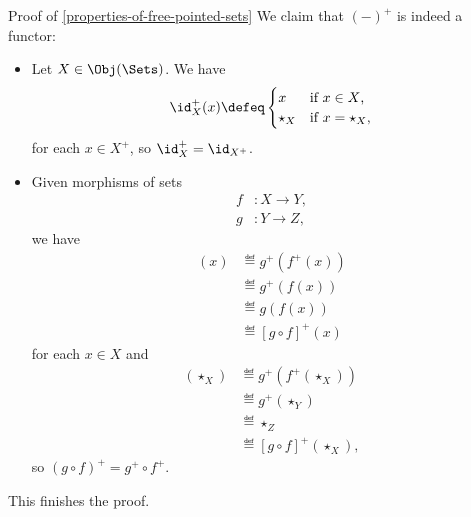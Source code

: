 \begin{Proof}{Proof of \cref{properties-of-free-pointed-sets}}%
    We claim that $(-)^{+}$ is indeed a functor:
    \begin{itemize}
        \item{}Let $X\in\Obj(\Sets)$. We have
            \[
                \id^{+}_{X}(x)%
                \defeq%
                \begin{cases}
                    x         &\text{if $x\in X$,}\\
                    \star_{X} &\text{if $x=\star_{X}$,}
                \end{cases}
            \]%
            for each $x\in X^{+}$, so $\id^{+}_{X}=\id_{X^{+}}$.
        \item{}Given morphisms of sets
            \begin{align*}
                f &\colon X \to Y,\\
                g &\colon Y \to Z,
            \end{align*}
            we have
            \begin{align*}
                [g^{+}\circ f^{+}](x) &\eqdef g^{+}(f^{+}(x))\\
                                      &\eqdef g^{+}(f(x))\\
                                      &\eqdef g(f(x))\\
                                      &\eqdef [g\circ f]^{+}(x)%
            \end{align*}
            for each $x\in X$ and
            \begin{align*}
                [g^{+}\circ f^{+}](\star_{X}) &\eqdef g^{+}(f^{+}(\star_{X}))\\
                                              &\eqdef g^{+}(\star_{Y})\\
                                              &\eqdef \star_{Z}\\
                                              &\eqdef [g\circ f]^{+}(\star_{X}),
            \end{align*}
            so $(g\circ f)^{+}=g^{+}\circ f^{+}$.
    \end{itemize}
    This finishes the proof.


\end{Proof}
